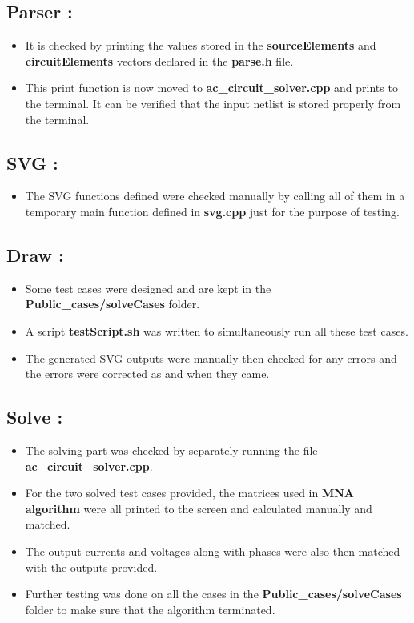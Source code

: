 \documentclass[]{article}
\begin{document}
\subsection{Parser :}
\Large\begin{itemize}
	\item It is checked by printing the values stored in the \textbf{sourceElements} and \textbf{circuitElements} vectors declared in the \textbf{parse.h} file. 
	\item This print function is now moved to \textbf{ac\_circuit\_solver.cpp} and prints to the terminal. It can be verified that the input netlist is stored properly from the terminal.
	\end{itemize}

\subsection{SVG :}
\Large\begin{itemize}
	\item The SVG functions defined were checked manually by calling all of them in a temporary main function defined in \textbf{svg.cpp} just for the purpose of testing. 	
\end{itemize}

\subsection{Draw :}
\Large\begin{itemize}
	\item Some test cases were designed and are kept in the \textbf{Public\_cases/solveCases} folder.
	\item A script \textbf{testScript.sh} was written to simultaneously run all these test cases.
	\item The generated SVG outputs were manually then checked for any errors and the errors were corrected as and when they came.
\end{itemize}

\subsection{Solve :}
\Large\begin{itemize}
	\item The solving part was checked by separately running the file \textbf{ac\_circuit\_solver.cpp}.
	\item For the two solved test cases provided, the matrices used in \textbf{MNA algorithm} were all printed to the screen and calculated manually and matched.
	\item The output currents and voltages along with phases were also then matched with the outputs provided. 
	\item Further testing was done on all the cases in the \textbf{Public\_cases/solveCases} folder to make sure that the algorithm terminated. 
\end{itemize}
\end{document}
